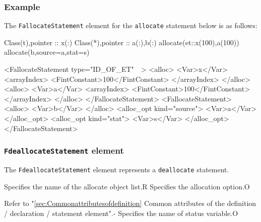 \subsubsection*{Example}

The {\tt FallocateStatement} element for the {\tt allocate} statement below is as follows:
\vspace{2mm}

\begin{Fexample2008}
Class(t),pointer :: x(:)
Class(*),pointer :: a(:),b(:)
allocate(et::x(100),a(100))
allocate(b,source=a,stat=s)
\end{Fexample2008}
\vspace{1mm}

\begin{XcodeMLFExample}
<FallocateStatement type="ID_OF_ET"　>
  <alloc>
    <Var>x</Var>
    <arrayIndex>
      <FintConstant>100</FintConstant>
    </arrayIndex>
  </alloc>
  <alloc>
     <Var>a</Var>
     <arrayIndex>
       <FintConstant>100</FintConstant>
     </arrayIndex>
   </alloc>
</FallocateStatement>
<FallocateStatement>
  <alloc>
    <Var>b</Var>
  </alloc>
  <alloc\_opt kind="source">
     <Var>a</Var>
  </alloc\_opt>
  <alloc\_opt kind="stat">
     <Var>s</Var>
  </alloc\_opt>
</FallocateStatement>
\end{XcodeMLFExample}


\subsubsection{ {\tt FdeallocateStatement} element}

The {\tt FdeallocateStatement} element represents a {\tt deallocate} statement.


\begin{XcodeMLChildElements}
{Specifies the name of the allocate object list.}{R}
{Specifies the allocation option.}{O}
\end{XcodeMLChildElements}

\begin{XcodeMLAttributes}
{Refer to "\ref{sec:Commonattributesofdefinition} Common attributes of the definition / declaration / statement element".}{-}
{Specifies the name of status variable.}{O}
\end{XcodeMLAttributes}



